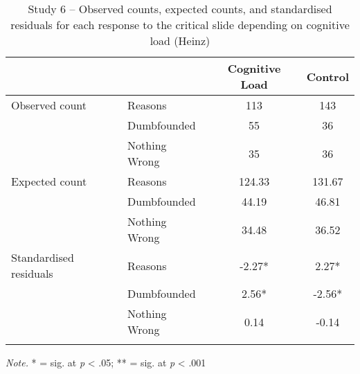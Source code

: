 \documentclass[
  american,
  man,floatsintext]{apa7}
\begin{document}
\begin{table}[tbp]

\begin{center}
\begin{threeparttable}

\caption{\label{tab:tabS6tab1dumbHeinz}Study 6 – Observed counts, expected counts, and standardised residuals for each response to the critical slide depending on cognitive load (Heinz)}

\begin{tabular}{llcc}
\toprule
 & \multicolumn{1}{c}{} & \multicolumn{1}{c}{Cognitive Load} & \multicolumn{1}{c}{Control}\\
\midrule
Observed count & Reasons & 113 & 143\\
 & Dumbfounded & 55 & 36\\
 & Nothing Wrong & 35 & 36\\
Expected count & Reasons & 124.33 & 131.67\\
 & Dumbfounded & 44.19 & 46.81\\
 & Nothing Wrong & 34.48 & 36.52\\
Standardised residuals & Reasons & -2.27* & 2.27*\\
 & Dumbfounded & 2.56* & -2.56*\\
 & Nothing Wrong & 0.14 & -0.14\\
\bottomrule
\addlinespace
\end{tabular}

\begin{tablenotes}[para]
\normalsize{\textit{Note.} * = sig. at \emph{p} < .05; ** = sig. at \emph{p} < .001}
\end{tablenotes}

\end{threeparttable}
\end{center}

\end{table}
\end{document}
